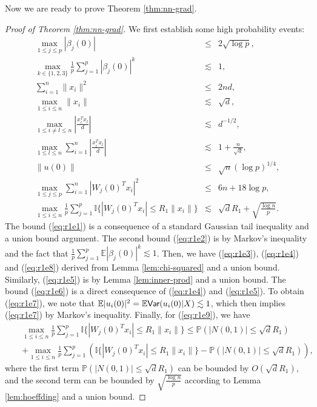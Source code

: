 Now we are ready to prove Theorem \ref{thm:nn-grad}.
\begin{proof}[Proof of Theorem \ref{thm:nn-grad}]
We first establish some high probability events:
\begin{eqnarray}
\label{eq:r1e1} \max_{1\leq j\leq p}|\beta_j(0)| &\leq& 2\sqrt{\log p}, \\
\label{eq:r1e2} \max_{k\in\{1,2,3\}}\frac{1}{p}\sum_{j=1}^p|\beta_j(0)|^k &\lesssim& 1, \\
\label{eq:r1e3} \sum_{i=1}^n\|x_i\|^2 &\leq& 2nd, \\
\label{eq:r1e4} \max_{1\leq i\leq n}\|x_i\| &\lesssim& \sqrt{d}, \\
\label{eq:r1e5} \max_{1\leq i\neq l\leq n}\left|\frac{x_i^Tx_l}{d}\right| &\lesssim& d^{-1/2}, \\
\label{eq:r1e6}\max_{1\leq l\leq n}\sum_{i=1}^n\left|\frac{x_i^Tx_l}{d}\right| &\lesssim& 1+\frac{n}{\sqrt{d}}, \\
 \label{eq:r1e7}\|u(0)\| &\leq& \sqrt{n}(\log p)^{1/4}, \\
 \label{eq:r1e8}\max_{1\leq j\leq p}\sum_{i=1}^n|W_j(0)^Tx_i|^2 &\leq& 6n+18\log p, \\
 \label{eq:r1e9}\max_{1\leq i\leq n}\frac{1}{p}\sum_{j=1}^p\mathbb{I}\{|W_j(0)^Tx_i|\leq R_1\|x_i\|\} &\lesssim& \sqrt{d}R_1 + \sqrt{\frac{\log n}{p}}.
\end{eqnarray}
The bound (\ref{eq:r1e1}) is a consequence of a standard Gaussian tail inequality and a union bound argument. The second bound (\ref{eq:r1e2}) is by Markov's inequality and the fact that $\frac{1}{p}\sum_{j=1}^p\mathbb{E}|\beta_j(0)|^k\lesssim 1$. Then, we have (\ref{eq:r1e3}), (\ref{eq:r1e4}) and (\ref{eq:r1e8}) derived from Lemma \ref{lem:chi-squared} and a union bound. Similarly, (\ref{eq:r1e5}) is by Lemma \ref{lem:inner-prod} and a union bound. The bound (\ref{eq:r1e6}) is a direct consequence of (\ref{eq:r1e4}) and (\ref{eq:r1e5}). To obtain (\ref{eq:r1e7}), we note that $\mathbb{E}|u_i(0)|^2 = \mathbb{E}\textsf{Var}(u_i(0)|X) \lesssim 1$, which then implies (\ref{eq:r1e7}) by Markov's inequality. Finally, for (\ref{eq:r1e9}), we have
\begin{eqnarray*}
&&\max_{1\leq i\leq n}\frac{1}{p}\sum_{j=1}^p\mathbb{I}\{|W_j(0)^Tx_i|\leq R_1\|x_i\|\} \leq \mathbb{P}\left(|N(0,1)|\leq \sqrt{d}R_1\right) \\
&&+ \max_{1\leq i\leq n}\frac{1}{p}\sum_{j=1}^p\left(\mathbb{I}\{|W_j(0)^Tx_i|\leq R_1\|x_i\|\}-\mathbb{P}\left(|N(0,1)|\leq \sqrt{d}R_1\right)\right),
\end{eqnarray*}
where the first term $\mathbb{P}\left(|N(0,1)|\leq \sqrt{d}R_1\right)$ can be bounded by $O(\sqrt{d}R_1)$, and the second term can be bounded by $\sqrt{\frac{\log n}{p}}$ according to Lemma \ref{lem:hoeffding} and a union bound.


\end{proof}
